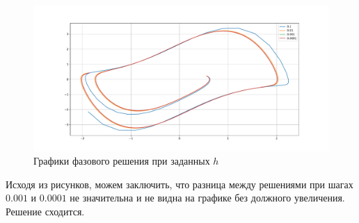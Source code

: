         \begin{figure}[H]
            \includegraphics[width=15cm]{pics/3_2.pdf}
            \centering
            \caption{Графики фазового решения при заданных \(h\)}
        \end{figure}

        Исходя из рисунков, можем заключить, что разница между решениями при шагах \(0.001\) и \(0.0001\) не значительна и не видна на графике без должного увеличения. Решение сходится.

        
